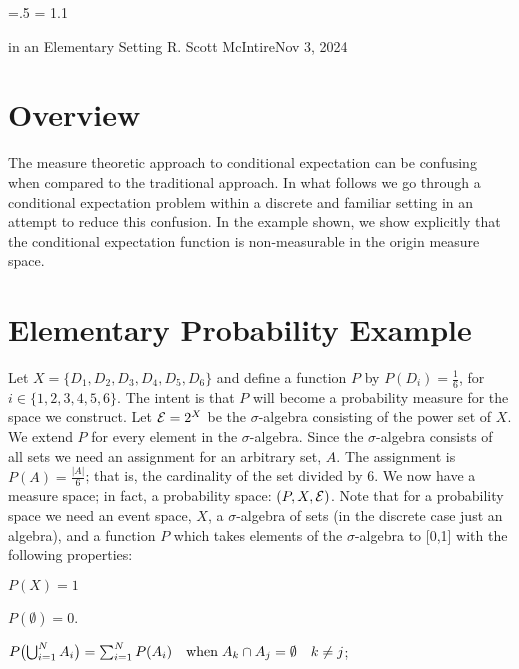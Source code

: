 




\parindent=0pt
\parskip=.5\baselineskip
\baselineskip = 1.1\baselineskip

\footline{\hss\tenrm\folio\hss}

        {in an Elementary Setting}
{R. Scott McIntire}{Nov 3, 2024}

\section{Overview}
The measure theoretic approach to conditional expectation can be confusing
when compared to the traditional approach.
In what follows we go through a conditional 
expectation problem within a discrete and familiar setting in an attempt 
to reduce this confusion. In the example shown, we show explicitly that the 
conditional expectation function is non-measurable in the origin 
measure space.


\section{Elementary Probability Example}
Let $X = \{D_1, D_2, D_3, D_4, D_5, D_6\}$ and define a function $P$ by 
$P(D_i) = \frac{1}{6}$, for $i\in \{1,2,3,4,5,6\}$. The intent is that $P$ will 
become a probability measure for the space we construct.
Let ${\cal E} = 2^X$ be the $\sigma$-algebra 
consisting of the power set of $X$. We extend $P$ for every element in the $\sigma$-algebra.
Since the $\sigma$-algebra consists of all sets 
we need an assignment for an arbitrary set, $A$. 
The assignment is $P(A) = \frac{|A|}{6}$; that is, the cardinality of the set divided by 6.
We now have a measure space; in fact, a probability space: $(P,X,{\cal E})$.
Note that for a probability space we need an event space, $X$, a $\sigma$-algebra of sets 
(in the discrete case just an algebra), and a function $P$ which takes 
elements of the $\sigma$-algebra to [0,1] with the following properties:

\beginEnum
\item{$P(X) = 1$}
\item{$P(\emptyset) = 0$.}
\item{$
P\bigl(\mathop{\bigcup}_{i=1}^N A_i\bigr) = \sum_{i=1}^N P(A_i) 
\quad {\rm when}\;  A_k \cap A_j = \emptyset \quad k\neq j
$;}
\endEnum

